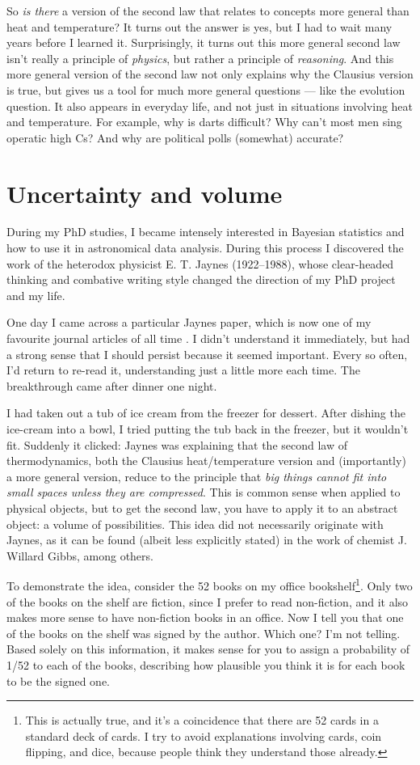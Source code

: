 \documentclass[a4paper, 12pt]{article}
\begin{document}
So {\em is there} a version of the second law that relates to concepts more
general than heat and temperature?
It turns out the answer is yes, but I had to wait many years before I learned it.
Surprisingly, it turns out this more general second law isn't really a
principle of {\em physics}, but rather a
principle of {\em reasoning}. And this more general version of the
second law not only explains why the Clausius version is true, but gives us
a tool for much more general questions --- like the evolution question.
It also appears in everyday life, and not just in situations involving heat and
temperature. For example,
why is darts difficult? Why can't most men sing operatic high Cs?
And why are political polls (somewhat) accurate?

\section*{Uncertainty and volume}
During my PhD studies, I became intensely interested in Bayesian statistics
\citep{brewer}
and how to use it in astronomical data analysis. During this process I
discovered the work of the heterodox physicist E. T. Jaynes \citep{jaynes_site}
(1922--1988), whose clear-headed thinking and combative writing style
changed the direction of my PhD project and my life.

One day I came across a particular Jaynes paper, which is now one of my
favourite journal articles of all time
\citep{jaynes}. I didn't understand it
immediately, but had a strong sense that I should persist because it seemed
important. Every so often, I'd return to re-read it, understanding
just a little more each time. The breakthrough came after dinner one
night.

I had taken out a tub of ice cream from the freezer for dessert. After dishing
the ice-cream into a bowl, I tried putting the tub back in the freezer, but
it wouldn't fit. Suddenly it clicked: Jaynes was explaining that
the second law of thermodynamics, both the Clausius heat/temperature version
and (importantly) a more general version, reduce to the
principle that {\em big things cannot fit into small spaces unless they are
compressed}. This is common sense when applied to physical objects, but to
get the second law, you have to apply it to an abstract object: a volume
of possibilities. This idea did not necessarily originate with Jaynes, as it
can be found (albeit less explicitly stated)
in the work of chemist J. Willard Gibbs, among others.

To demonstrate the idea, consider the 52 books on my office bookshelf\footnote{This
is actually true, and it's a coincidence that there are 52 cards in a standard
deck of cards. I try to avoid explanations involving cards, coin flipping, and
dice, because people think they understand those already.}.
Only two of the books on the shelf are fiction, since I prefer to read
non-fiction, and it also makes more sense to have non-fiction books in an
office. Now I tell you that one of the books on the shelf was
signed by the author. Which one? I'm not telling. Based solely on this
information, it makes sense for you to assign a probability of 1/52 to each of the
books, describing how plausible you think it is for each book to be the signed
one.
\end{document}
